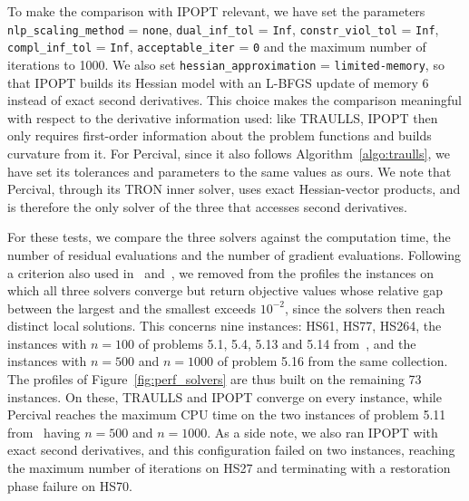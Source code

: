 To make the comparison with IPOPT relevant, we have set the parameters \texttt{nlp\_scaling\_method} = \texttt{none}, \texttt{dual\_inf\_tol} = \texttt{Inf}, \texttt{constr\_viol\_tol} = \texttt{Inf}, \texttt{compl\_inf\_tol} = \texttt{Inf}, \texttt{acceptable\_iter} = \texttt{0} and the maximum number of iterations to 1000. We also set \texttt{hessian\_approximation} = \texttt{limited-memory}, so that IPOPT builds its Hessian model with an L-BFGS update of memory 6 instead of exact second derivatives. This choice makes the comparison meaningful with respect to the derivative information used: like TRAULLS, IPOPT then only requires first-order information about the problem functions and builds curvature from it. For Percival, since it also follows Algorithm~\ref{algo:traulls}, we have set its tolerances and parameters to the same values as ours. We note that Percival, through its TRON inner solver, uses exact Hessian-vector products, and is therefore the only solver of the three that accesses second derivatives.

For these tests, we compare the three solvers against the computation time, the number of residual evaluations and the number of gradient evaluations. Following a criterion also used in~\cite{wachterbiegler:2006} and~\cite{migot-etal:2026}, we removed from the profiles the instances on which all three solvers converge but return objective values whose relative gap between the largest and the smallest exceeds $10^{-2}$, since the solvers then reach distinct local solutions. This concerns nine instances: HS61, HS77, HS264, the instances with $n=100$ of problems 5.1, 5.4, 5.13 and 5.14 from~\cite{lucksanvlcek:1999}, and the instances with $n=500$ and $n=1000$ of problem 5.16 from the same collection. The profiles of Figure~\ref{fig:perf_solvers} are thus built on the remaining 73 instances. On these, TRAULLS and IPOPT converge on every instance, while Percival reaches the maximum CPU time on the two instances of problem 5.11 from~\cite{lucksanvlcek:1999} having $n=500$ and $n=1000$. As a side note, we also ran IPOPT with exact second derivatives, and this configuration failed on two instances, reaching the maximum number of iterations on HS27 and terminating with a restoration phase failure on HS70.

